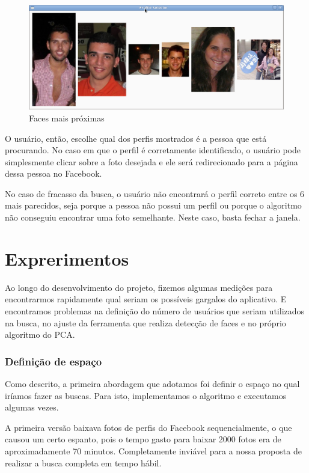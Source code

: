 \documentclass[10pt,a4paper]{article}
\begin{document}
\begin{figure}[h!]
    \begin{center}
      \includegraphics[scale=0.4]{6maisproximos}
      \caption{Faces mais próximas}
    \end{center}
  \end{figure}


O usuário, então, escolhe qual dos perfis mostrados é a pessoa que está procurando. No caso em que o perfil é corretamente identificado, o usuário pode simplesmente clicar sobre a foto desejada e ele será redirecionado para a página dessa pessoa no Facebook.

No caso de fracasso da busca, o usuário não encontrará o perfil correto entre os 6 mais parecidos, seja porque a pessoa não possui um perfil ou porque o algoritmo não conseguiu encontrar uma foto semelhante. Neste caso, basta fechar a janela.

  

\section{Exprerimentos}%

Ao longo do desenvolvimento do projeto, fizemos algumas medições para encontrarmos
rapidamente qual seriam os possíveis gargalos do aplicativo. E encontramos problemas na definição do número de usuários que seriam utilizados na busca, no ajuste da ferramenta que realiza detecção de faces e no próprio algoritmo do PCA.

\subsubsection*{Definição de espaço}
	
Como descrito, a primeira abordagem que adotamos foi definir o espaço no qual iríamos fazer as buscas. Para isto, implementamos o algoritmo e executamos algumas vezes.

	A primeira versão baixava fotos de perfis do Facebook sequencialmente, o que causou um certo espanto, pois o tempo gasto para baixar 2000 fotos era de aproximadamente 70 minutos. Completamente inviável para a nossa proposta de realizar a busca completa em tempo hábil.
\end{document}
